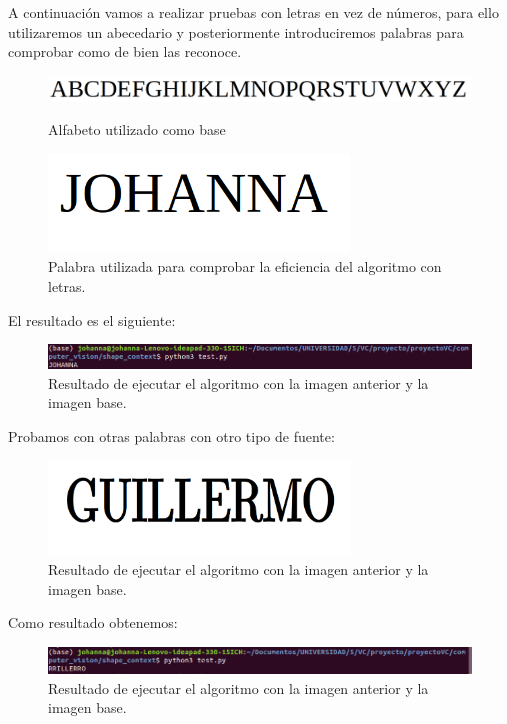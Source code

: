 \documentclass[size=a4, parskip=half, titlepage=false, toc=flat, toc=bib, 12pt]{scrartcl}
\begin{document}
A continuación vamos a realizar pruebas con letras en vez de números, para ello utilizaremos un abecedario y posteriormente introduciremos palabras para comprobar como de bien las reconoce.

\begin{figure}[H]
\centering
\includegraphics[width=15cm]{./img/ABC}
\caption{Alfabeto utilizado como base}
\includegraphics[width=8cm]{./img/JOHANNA}
\caption{Palabra utilizada para comprobar la eficiencia del algoritmo con letras.}
\end{figure}

El resultado es el siguiente:
\begin{figure}[H]
\centering
\includegraphics[width=15cm]{./img/resjohanna}
\caption{Resultado de ejecutar el algoritmo con la imagen anterior y la imagen base.}
\end{figure}

Probamos con otras palabras con otro tipo de fuente:
\begin{figure}[H]
\centering
\includegraphics[width=8cm]{./img/GUILLERMO}
\caption{Resultado de ejecutar el algoritmo con la imagen anterior y la imagen base.}
\end{figure}

Como resultado obtenemos:

\begin{figure}[H]
\centering
\includegraphics[width=15cm]{./img/resguillermo}
\caption{Resultado de ejecutar el algoritmo con la imagen anterior y la imagen base.}
\end{figure}
\end{document}
